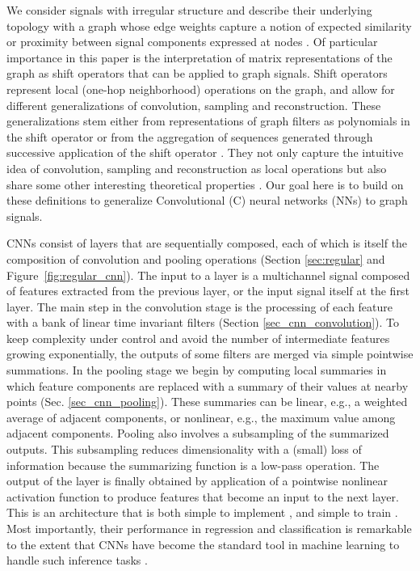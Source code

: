 

We consider signals with irregular structure and describe their underlying topology with a graph whose edge weights capture a notion of expected similarity or proximity between signal components expressed at nodes \cite{sandryhaila13-dspg, sandryhaila14-freq, shuman13-mag, sandryhaila14-mag}. Of particular importance in this paper is the interpretation of matrix representations of the graph as shift operators that can be applied to graph signals. Shift operators represent local (one-hop neighborhood) operations on the graph, and allow for different generalizations of convolution, sampling and reconstruction. These generalizations stem either from representations of graph filters as polynomials in the shift operator \cite{sandryhaila13-dspg, segarra17-linear, shuman18-chebyshev} or from the aggregation of sequences generated through successive application of the shift operator \cite{marques16-aggregation}. They not only capture the intuitive idea of convolution, sampling and reconstruction as local operations but also share some other interesting theoretical properties \cite{segarra17-linear, sandryhaila13-dspg, sandryhaila14-freq}. Our goal here is to build on these definitions to generalize Convolutional (C) neural networks (NNs) to graph signals.

CNNs consist of layers that are sequentially composed, each of which is itself the composition of convolution and pooling operations (Section \ref{sec:regular} and Figure~\ref{fig:regular_cnn}). The input to a layer is a multichannel signal composed of features extracted from the previous layer, or the input signal itself at the first layer. The main step in the convolution stage is the processing of each feature with a bank of linear time invariant filters (Section \ref{sec_cnn_convolution}). To keep complexity under control and avoid the number of intermediate features growing exponentially, the outputs of some filters are merged via simple pointwise summations. In the pooling stage we begin by computing local summaries in which feature components are replaced with a summary of their values at nearby points (Sec. \ref{sec_cnn_pooling}). These summaries can be linear, e.g., a weighted average of adjacent components, or nonlinear, e.g., the maximum value among adjacent components. Pooling also involves a subsampling of the summarized outputs. This subsampling reduces dimensionality with a (small) loss of information because the summarizing function is a low-pass operation. The output of the layer is finally obtained by application of a pointwise nonlinear activation function to produce features that become an input to the next layer. This is an architecture that is both simple to implement \cite{najafabadi15-cnnbigdata}, and simple to train \cite{rumelhart86-backprop}. Most importantly, their performance in regression and classification is remarkable to the extent that CNNs have become the standard tool in machine learning to handle such inference tasks \cite{lecun15-deeplearning, lecun10-vision, greenspan16-medical}. 


